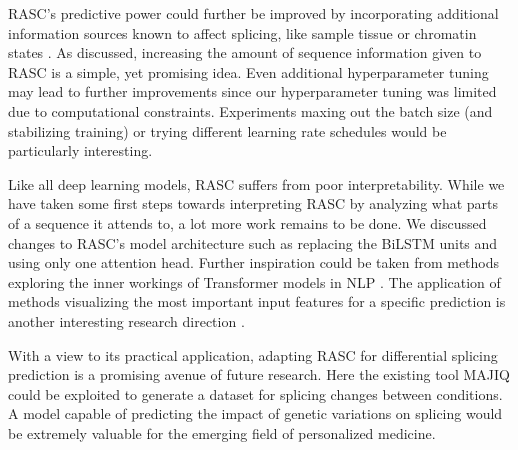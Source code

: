 RASC's predictive power could further be improved by incorporating additional information sources known to affect splicing, like sample tissue or chromatin states \cite{chromatin}. As discussed, increasing the amount of sequence information given to RASC is a simple, yet promising idea. 
Even additional hyperparameter tuning may lead to further improvements since our hyperparameter tuning was limited due to computational constraints. Experiments maxing out the batch size (and stabilizing training) or trying different learning rate schedules would be particularly interesting. 


Like all deep learning models, RASC suffers from poor interpretability. While we have taken some first steps towards interpreting RASC by analyzing what parts of a sequence it attends to, a lot more work remains to be done. We discussed changes to RASC's model architecture such as replacing the BiLSTM units and using only one attention head. Further inspiration could be taken from methods exploring the inner workings of Transformer models in NLP \cite{interpretingbert}. The application of methods visualizing the most important input features for a specific prediction is another interesting research direction \cite{deeplift}. 
%

With a view to its practical application, adapting RASC for differential splicing prediction is a promising avenue of future research. Here the existing tool MAJIQ could be exploited to generate a dataset for splicing changes between conditions. A model capable of predicting the impact of genetic variations on splicing would be extremely valuable for the emerging field of personalized medicine.




%
%
% 
%
%
